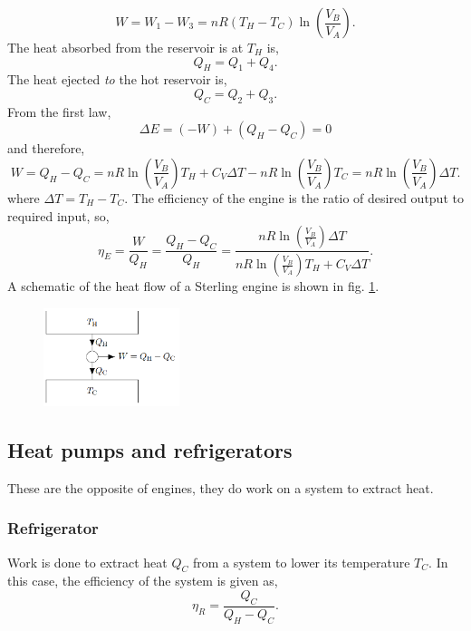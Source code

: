 \documentclass{book}
\begin{document}
\begin{equation}
	W = W_1 - W_3 = nR(T_H - T_C)\ln\left(\frac{V_B}{V_A}\right).
\end{equation}
The heat absorbed from the reservoir is at $T_H$ is,
\begin{equation}
	Q_H = Q_1 + Q_4.
\end{equation}
The heat ejected \textit{to} the hot reservoir is,
\begin{equation}
	Q_C = Q_2 + Q_3.
\end{equation}
From the first law,
\begin{equation}
	\Delta E = (-W) + (Q_H - Q_C) = 0
\end{equation}
and therefore,
\begin{equation}
	W = Q_H - Q_C = nR\ln\left(\frac{V_B}{V_A}\right)T_H + C_V\Delta T - nR\ln\left(\frac{V_B}{V_A}\right)T_C = nR\ln\left(\frac{V_B}{V_A}\right)\Delta T.
\end{equation}
where $\Delta T = T_H - T_C$. The efficiency of the engine is the ratio of desired output to required input, so,
\begin{equation}
	\eta_E = \frac{W}{Q_H}  = \frac{Q_H - Q_C}{Q_H} = \frac{nR\ln\left(\frac{V_B}{V_A}\right)\Delta T}{nR\ln\left(\frac{V_B}{V_A}\right)T_H + C_V\Delta T}.
\end{equation}
A schematic of the heat flow of a Sterling engine is shown in fig. \ref{fig:sterlingengine}.
\begin{figure}
	\centering
	\includegraphics[width=150px]{sterlingengine.png}
	\caption{}\label{fig:sterlingengine}
\end{figure}
\subsection{Heat pumps and refrigerators}
These are the opposite of engines, they do work on a system to extract heat.
\subsubsection{Refrigerator}
Work is done to extract heat $Q_C$ from a system to lower its temperature $T_C$. In this case, the efficiency of the system is given as,
\begin{equation}
	\eta_R = \frac{Q_C}{Q_H - Q_C}.
\end{equation}
\end{document}
